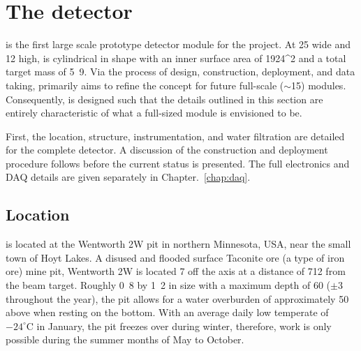 \section{The \chipsfive detector} %
\label{sec:chips_detector} %

\chipsfive is the first large scale prototype detector module for the \chips project. At
\unit{25}{} wide and \unit{12}{} high, \chipsfive is cylindrical in shape with an
inner surface area of \unit{1924}{^2} and a total target mass of \unit{5.9}{}.
Via the process of design, construction, deployment, and data taking, \chipsfive primarily aims to
refine the \chips concept for future full-scale ($\sim$\unit{15}{}) modules.
Consequently, \chipsfive is designed such that the details outlined in this section are entirely
characteristic of what a full-sized \chips module is envisioned to be.

First, the location, structure, instrumentation, and water filtration are detailed for the
complete detector. A discussion of the construction and deployment procedure follows before the
current status is presented. The full electronics and DAQ details are given separately in
Chapter.~\ref{chap:daq}.

\subsection{Location} %
\label{sec:chips_detector_location} %

\chipsfive is located at the Wentworth 2W pit in northern Minnesota, USA, near the small town of
Hoyt Lakes. A disused and flooded surface Taconite ore (a type of iron ore) mine pit, Wentworth 2W
is located \unit{7}{} off the \numi axis at a distance of \unit{712}{} from
the beam target. Roughly \unit{0.8}{} by \unit{1.2}{} in size with a maximum
depth of \unit{60}{} ($\pm$\unit{3}{} throughout the year), the pit allows for a
water overburden of approximately \unit{50}{} above \chipsfive when resting on the bottom.
With an average daily low temperate of $-24^{\circ}\text{C}$ in January, the pit freezes over
during winter, therefore, work is only possible during the summer months of May to October.

